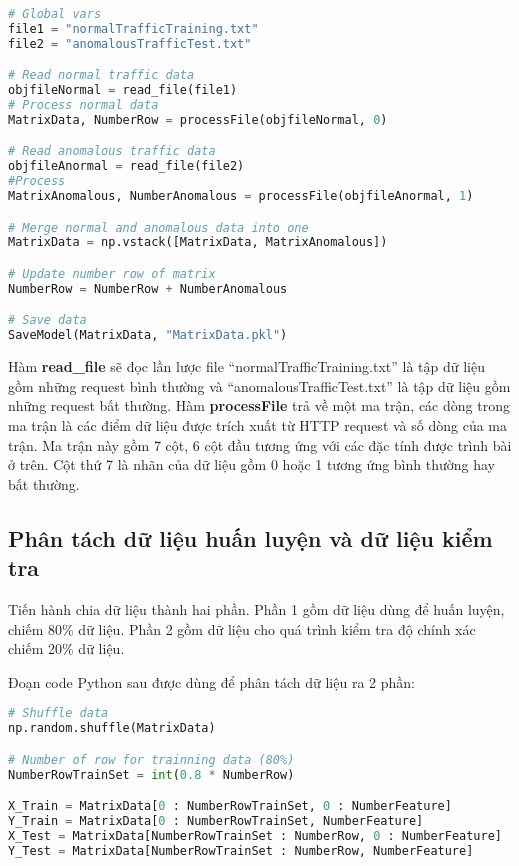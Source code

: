 \documentclass[../main-report.tex]{subfiles}
\begin{document}
\begin{lstlisting}[language=Python]
# Global vars
file1 = "normalTrafficTraining.txt"
file2 = "anomalousTrafficTest.txt"

# Read normal traffic data
objfileNormal = read_file(file1)
# Process normal data
MatrixData, NumberRow = processFile(objfileNormal, 0)

# Read anomalous traffic data
objfileAnormal = read_file(file2)
#Process
MatrixAnomalous, NumberAnomalous = processFile(objfileAnormal, 1)

# Merge normal and anomalous data into one
MatrixData = np.vstack([MatrixData, MatrixAnomalous])

# Update number row of matrix
NumberRow = NumberRow + NumberAnomalous

# Save data
SaveModel(MatrixData, "MatrixData.pkl")
\end{lstlisting}

Hàm \textbf{read\_file} sẽ đọc lần lược file ``normalTrafficTraining.txt''  là tập dữ liệu gồm những request bình thường và  ``anomalousTrafficTest.txt'' là tập dữ liệu gồm những request bất thường. Hàm \textbf{processFile} trả về một ma trận, các dòng trong ma trận là các điểm dữ liệu được trích xuất từ HTTP request và số dòng của ma trận. Ma trận này gồm 7 cột, 6 cột đầu tương ứng với các đặc tính được trình bài ở trên. Cột thứ 7 là nhãn của dữ liệu gồm 0 hoặc 1 tương ứng bình thường hay bất thường.

\subsection{Phân tách dữ liệu huấn luyện và dữ liệu kiểm tra}
Tiến hành chia dữ liệu thành hai phần. Phần 1 gồm dữ liệu dùng để huấn luyện, chiếm 80\% dữ liệu. Phần 2 gồm dữ liệu cho quá trình kiểm tra độ chính xác chiếm 20\% dữ liệu.

Đoạn code Python sau được dùng để phân tách dữ liệu ra 2 phần:

\begin{lstlisting}[language=Python]
# Shuffle data
np.random.shuffle(MatrixData)

# Number of row for trainning data (80%)
NumberRowTrainSet = int(0.8 * NumberRow)

X_Train = MatrixData[0 : NumberRowTrainSet, 0 : NumberFeature]
Y_Train = MatrixData[0 : NumberRowTrainSet, NumberFeature]
X_Test = MatrixData[NumberRowTrainSet : NumberRow, 0 : NumberFeature]
Y_Test = MatrixData[NumberRowTrainSet : NumberRow, NumberFeature]
\end{lstlisting}
\end{document}
